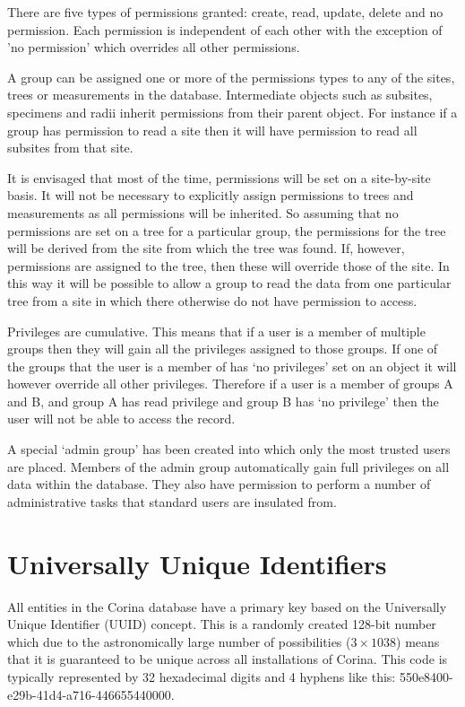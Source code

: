 There are five types of permissions granted: create, read, update, delete and no permission. Each permission is independent of each other with the exception of 'no permission' which overrides all other permissions.

A group can be assigned one or more of the permissions types to any of the sites, trees or measurements in the database. Intermediate objects such as subsites, specimens and radii inherit permissions from their parent object. For instance if a group has permission to read a site then it will have permission to read all subsites from that site.

It is envisaged that most of the time, permissions will be set on a site-by-site basis. It will not be necessary to explicitly assign permissions to trees and measurements as all permissions will be inherited. So assuming that no permissions are set on a tree for a particular group, the permissions for the tree will be derived from the site from which the tree was found. If, however, permissions are assigned to the tree, then these will override those of the site. In this way it will be possible to allow a group to read the data from one particular tree from a site in which there otherwise do not have permission to access.

Privileges are cumulative. This means that if a user is a member of multiple groups then they will gain all the privileges assigned to those groups. If one of the groups that the user is a member of has `no privileges' set on an object it will however override all other privileges. Therefore if a user is a member of groups A and B, and group A has read privilege and group B has `no privilege' then the user will not be able to access the record.

A special `admin group' has been created into which only the most trusted users are placed. Members of the admin group automatically gain full privileges on all data within the database. They also have permission to perform a number of administrative tasks that standard users are insulated from. 


\section{Universally Unique Identifiers}
\label{txt:uuid}
All entities in the Corina database have a primary key based on the Universally Unique Identifier (UUID) concept. This is a randomly created 128-bit number which due to the astronomically large number of possibilities ($3 \times 1038$) means that it is guaranteed to be unique across all installations of Corina. This code is typically represented by 32 hexadecimal digits and 4 hyphens like this: 550e8400-e29b-41d4-a716-446655440000.


